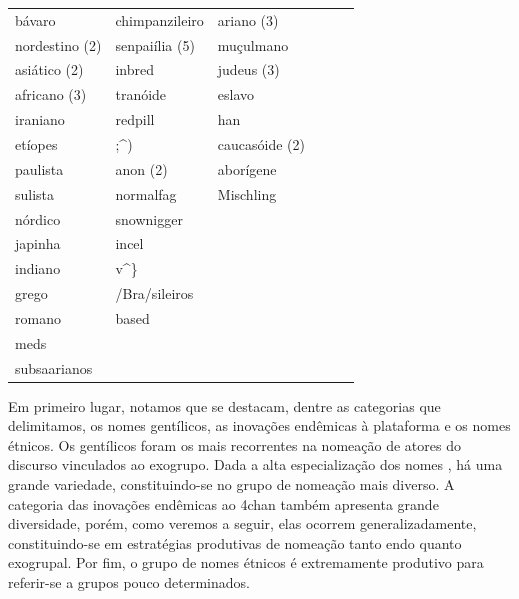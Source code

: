 \documentclass[portuguese]{textolivre}
\begin{document}
\begin{table}[h!]
\begin{tabular}{llllll}
bávaro & chimpanzileiro & \cellcolor[HTML]{EFEFEF}ariano (3) &  &  &  \\
\cellcolor[HTML]{EFEFEF}nordestino (2) & \cellcolor[HTML]{EFEFEF}senpaiília (5) & muçulmano &  &  &  \\
\cellcolor[HTML]{EFEFEF}asiático (2) & inbred & \cellcolor[HTML]{EFEFEF}judeus (3) &  &  &  \\ 
\cellcolor[HTML]{EFEFEF}africano (3) & tranóide & eslavo &  &  &  \\
iraniano & redpill & han &  &  &  \\
etíopes & ;\textasciicircum{}) & \cellcolor[HTML]{EFEFEF}caucasóide (2) &  &  &  \\
paulista & \cellcolor[HTML]{EFEFEF}anon (2) & aborígene &  &  &  \\
sulista & normalfag & Mischling &  &  &  \\
nórdico & snownigger &  &  &  &  \\
japinha & incel &  &  &  &  \\
indiano & v\textasciicircum{}\} &  &  &  &  \\
grego & /Bra/sileiros &  &  &  &  \\
romano & based &  &  &  &  \\
meds &  &  &  &  &  \\
subsaarianos &  &  &  &  &  \\
\bottomrule
\end{tabular}
\end{table}

Em primeiro lugar, notamos que se destacam, dentre as categorias que delimitamos, os nomes gentílicos, as inovações endêmicas à plataforma e os nomes étnicos. Os gentílicos foram os mais recorrentes na nomeação de atores do discurso vinculados ao exogrupo. Dada a alta especialização dos nomes \cite{van1996representation}, há uma grande variedade, constituindo-se no grupo de nomeação mais diverso. A categoria das inovações endêmicas ao 4chan também apresenta grande diversidade, porém, como veremos a seguir, elas ocorrem generalizadamente, constituindo-se em estratégias produtivas de nomeação tanto endo quanto exogrupal. Por fim, o grupo de nomes étnicos é extremamente produtivo para referir-se a grupos pouco determinados. 
\end{document}

